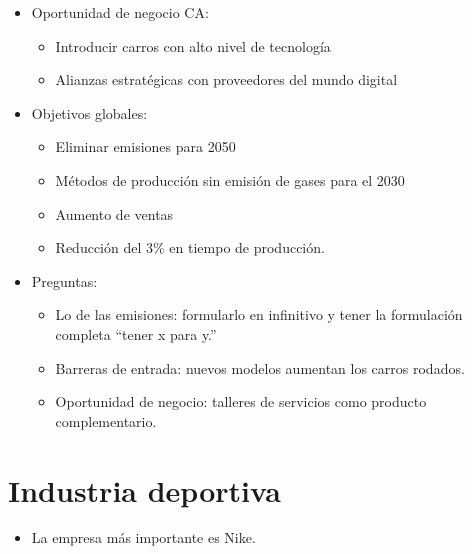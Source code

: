 \begin{itemize}
    \item Oportunidad de negocio CA: 
        \begin{itemize}
            \item Introducir carros con alto nivel de tecnología 
            \item Alianzas estratégicas con proveedores del mundo digital 
        \end{itemize}
    
    \item Objetivos globales:
        \begin{itemize}
            \item Eliminar emisiones para 2050 
            \item Métodos de producción sin emisión de gases para el 2030 
            \item Aumento de ventas 
            \item Reducción del 3\% en tiempo de producción. 
        \end{itemize}
    
    \item Preguntas:
        \begin{itemize}
            \item {} Lo de las emisiones: formularlo en infinitivo y tener la formulación completa ``tener x para y.''
            \item Barreras de entrada: nuevos modelos aumentan los carros rodados. 
            \item {} Oportunidad de negocio: talleres de servicios como producto complementario. 
        \end{itemize}
\end{itemize}

\section{Industria deportiva}
\begin{itemize}
    \item La empresa más importante es Nike.
\end{itemize}
